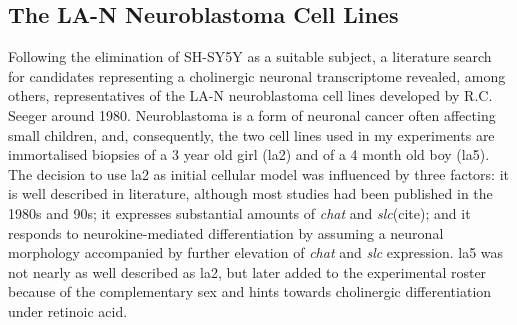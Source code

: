 \subsection{The LA-N Neuroblastoma Cell Lines}
Following the elimination of SH-SY5Y as a suitable subject, a literature search for candidates representing a cholinergic neuronal transcriptome revealed, among others, representatives of the LA-N neuroblastoma cell lines developed by R.C. Seeger around 1980.\cite{Seeger1977, Seeger1982} Neuroblastoma is a form of neuronal cancer often affecting small children, and, consequently, the two cell lines used in my experiments are immortalised biopsies of a 3 year old girl (\acs{la2}\cite{Seeger1977}) and of a 4 month old boy (\mbox{\acs{la5}}\cite{Seeger1982}). The decision to use \ac{la2} as initial cellular model was influenced by three factors: it is well described in literature, although most studies had been published in the 1980s and 90s; it expresses substantial amounts of \textit{\ac{chat}} and \textit{\ac{slc}}(cite); and it responds to neurokine-mediated differentiation by assuming a neuronal morphology accompanied by further elevation of \textit{\ac{chat}} and \textit{\ac{slc}} expression. \ac{la5} was not nearly as well described as \ac{la2}, but later added to the experimental roster because of the complementary sex and hints towards cholinergic differentiation under retinoic acid.\cite{Hill1997}

